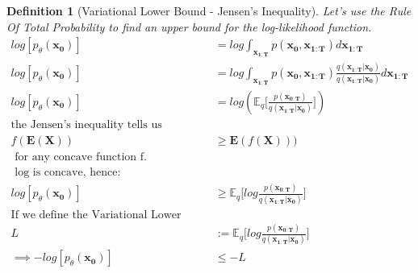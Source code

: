 \documentclass{article}
\newtheorem{definition}{Definition}[section]
\begin{document}
\begin{definition}[Variational Lower Bound - Jensen's Inequality]
	Let's use the Rule Of Total Probability to find an upper bound for the log-likelihood function.
	\label{def:var_low_bound_jensen}
	\begin{align}
		log [p_\theta(\mathbf{x_0})] &=  log \int_\mathbf{x_{1:T}} p(\mathbf{x_0}, \mathbf{x_{1:T}})d\mathbf{x_{1:T}} \\
		log [p_\theta(\mathbf{x_0})] &=  log \int_\mathbf{x_{1:T}} p(\mathbf{x_0}, \mathbf{x_{1:T}}) \frac{q(\mathbf{x_{1:T}| x_0})}{q(\mathbf{x_{1:T}| x_0})}d\mathbf{x_{1:T}} 	\\
		log [p_\theta(\mathbf{x_0})] &= log (\mathbb{E}_q\bigg[\frac{p(\mathbf{x_{0:T}})} {q(\mathbf{x_{1:T}| x_0})}\bigg]) \\
		\text{the Jensen's inequality tells us}& \\
		f(\mathbf{E}(\mathbf{X})) &\geq \mathbf{E}(f(\mathbf{X})))\\
		\text{   for any concave function f.} &\\
		\text{ log is concave, hence:} &  \\
		log [p_\theta(\mathbf{x_0})] &\geq \mathbb{E}_q\bigg[log \frac{p(\mathbf{x_{0:T}})} {q(\mathbf{x_{1:T}| x_0})}\bigg] \\
		\text{If we define the Variational Lower Bound L as:}  &\\
		L &:=   \mathbb{E}_q\bigg[log \frac{p(\mathbf{x_{0:T}})} {q(\mathbf{x_{1:T}| x_0})}\bigg] \\
		\implies - log [p_\theta(\mathbf{x_0})] &\leq - L
	\end{align}
\end{definition}
\end{document}
